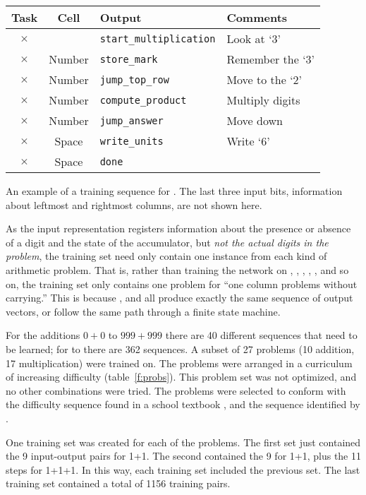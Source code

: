 \begin{fancytable}
\begin{center}
\begin{tabular}{ccll}
Task&Cell&Output&Comments\\\hline
$\times$&&\verb|start_multiplication|&Look at `3'\\
$\times$&Number&\verb|store_mark|&Remember the `3'\\
$\times$&Number&\verb|jump_top_row|&Move to the `2'\\
$\times$&Number&\verb|compute_product|&Multiply digits\\
$\times$&Number&\verb|jump_answer|&Move down\\
$\times$&Space&\verb|write_units|&Write `6'\\
$\times$&Space&\verb|done|&
\end{tabular}
\end{center}
\caption{An example of a training sequence for .  The last three
input bits, information about leftmost and rightmost columns, are not
shown here.}
\label{f:ioeg}
\end{fancytable}

As the input representation registers information about the presence or
absence of a digit and the state of the accumulator, but {\em not the
actual digits in the problem}, the training set need only contain one
instance from each kind of arithmetic problem.  That is, rather than
training the network on , , , , ,
and so on, the training set only contains one problem for ``one column
problems without carrying.''  This is because ,  and
 all produce exactly the same sequence of output vectors, or follow
the same path through a finite state machine.

For the additions $0+0$ to $999+999$ there are 40 different sequences that
need to be learned; for  to  there are 362 sequences.  A
subset of 27 problems (10 addition, 17 multiplication) were trained on.
The problems were arranged in a curriculum of increasing difficulty
(table~\ref{f:probs}). This problem set was not optimized, and no other
combinations were tried. The problems were selected to conform with the
difficulty sequence found in a school textbook \cite{howemath}, and the
sequence identified by .


One training set was created for each of the problems.  The first set
just contained the 9 input-output pairs for 1+1.  The second contained the
9 for 1+1, plus the 11 steps for 1+1+1. In this way, each training set
included the previous set. The last training set contained a total of 1156
training pairs.

